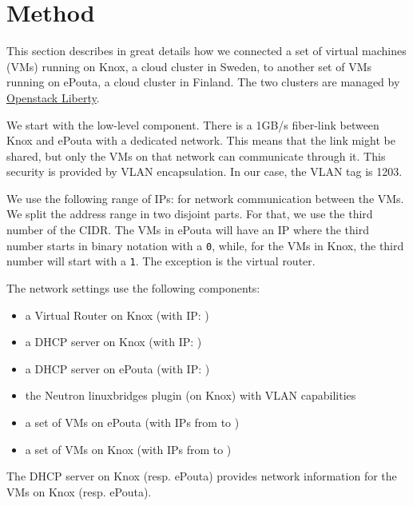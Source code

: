 \section{Method}
\label{section:method}

\cutafter

This section describes in great details how we connected a set of
virtual machines (VMs) running on Knox, a cloud cluster in Sweden, to
another set of VMs running on ePouta, a cloud cluster in Finland. The
two clusters are managed by
\href{http://docs.openstack.org/liberty/install-guide-ubuntu/}{Openstack
  Liberty}.

We start with the low-level component. There is a 1GB/s fiber-link
between Knox and ePouta with a dedicated network. This means that the
link might be shared, but only the VMs on that network can communicate
through it. This security is provided by VLAN encapsulation. In our
case, the VLAN tag is 1203.

We use the following range of IPs:  for network
communication between the VMs. We split the address range in two
disjoint parts. For that, we use the third number of the
 CIDR. The VMs in ePouta will have an IP where the
third number starts in binary notation with a \texttt{0}, while, for the
VMs in Knox, the third number will start with a \texttt{1}. The
exception is the virtual router.

The network settings use the following components:
\begin{itemize}
\item a Virtual Router on Knox (with IP: )
\item a DHCP server on Knox (with IP: )
\item a DHCP server on ePouta (with IP: )
\item the Neutron linuxbridges plugin (on Knox) with VLAN capabilities
\item a set of VMs on ePouta (with IPs from  to
  )
\item a set of VMs on Knox (with IPs from  to
  )
\end{itemize}

The DHCP server on Knox (resp. ePouta) provides network information for
the VMs on Knox (resp. ePouta).

